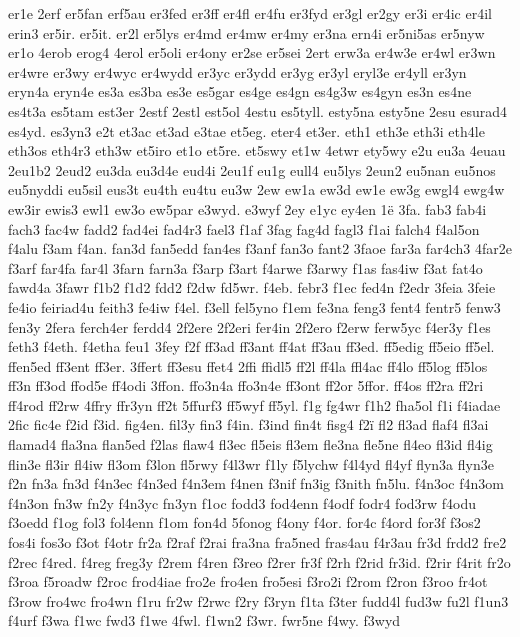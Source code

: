 {er1e
2erf
er5fan
erf5au
er3fed
er3ff
er4fl
er4fu
er3fyd
er3gl
er2gy
er3i
er4ic
er4il
erin3
er5ir.
er5it.
er2l
er5lys
er4md
er4mw
er4my
er3na
ern4i
er5ni5as
er5nyw
er1o
4erob
erog4
4erol
er5oli
er4ony
er2se
er5sei
2ert
erw3a
er4w3e
er4wl
er3wn
er4wre
er3wy
er4wyc
er4wydd
er3yc
er3ydd
er3yg
er3yl
eryl3e
er4yll
er3yn
eryn4a
eryn4e
es3a
es3ba
es3e
es5gar
es4ge
es4gn
es4g3w
es4gyn
es3n
es4ne
es4t3a
es5tam
est3er
2estf
2estl
est5ol
4estu
es5tyll.
esty5na
esty5ne
2esu
esurad4
es4yd.
es3yn3
e2t
et3ac
et3ad
e3tae
et5eg.
eter4
et3er.
eth1
eth3e
eth3i
eth4le
eth3os
eth4r3
eth3w
et5iro
et1o
et5re.
et5swy
et1w
4etwr
ety5wy
e2u
eu3a
4euau
2eu1b2
2eud2
eu3da
eu3d4e
eud4i
2eu1f
eu1g
eull4
eu5lys
2eun2
eu5nan
eu5nos
eu5nyddi
eu5sil
eus3t
eu4th
eu4tu
eu3w
2ew
ew1a
ew3d
ew1e
ew3g
ewgl4
ewg4w
ew3ir
ewis3
ewl1
ew3o
ew5par
e3wyd.
e3wyf
2ey
e1yc
ey4en
1ë
3fa.
fab3
fab4i
fach3
fac4w
fadd2
fad4ei
fad4r3
fael3
f1af
3fag
fag4d
fagl3
f1ai
falch4
f4al5on
f4alu
f3am
f4an.
fan3d
fan5edd
fan4es
f3anf
fan3o
fant2
3faoe
far3a
far4ch3
4far2e
f3arf
far4fa
far4l
3farn
farn3a
f3arp
f3art
f4arwe
f3arwy
f1as
fas4iw
f3at
fat4o
fawd4a
3fawr
f1b2
f1d2
fdd2
f2dw
fd5wr.
f4eb.
febr3
f1ec
fed4n
f2edr
3feia
3feie
fe4io
feiriad4u
feith3
fe4iw
f4el.
f3ell
fel5yno
f1em
fe3na
feng3
fent4
fentr5
fenw3
fen3y
2fera
ferch4er
ferdd4
2f2ere
2f2eri
fer4in
2f2ero
f2erw
ferw5yc
f4er3y
f1es
feth3
f4eth.
f4etha
feu1
3fey
f2f
ff3ad
ff3ant
ff4at
ff3au
ff3ed.
ff5edig
ff5eio
ff5el.
ffen5ed
ff3ent
ff3er.
3ffert
ff3esu
ffet4
2ffi
ffidl5
ff2l
ff4la
ffl4ac
ff4lo
ff5log
ff5los
ff3n
ff3od
ffod5e
ff4odi
3ffon.
ffo3n4a
ffo3n4e
ff3ont
ff2or
5ffor.
ff4os
ff2ra
ff2ri
ff4rod
ff2rw
4ffry
ffr3yn
ff2t
5ffurf3
ff5wyf
ff5yl.
f1g
fg4wr
f1h2
fha5ol
f1i
f4iadae
2fic
fic4e
f2id
f3id.
fig4en.
fil3y
fin3
f4in.
f3ind
fin4t
fisg4
f2ï
fl2
fl3ad
flaf4
fl3ai
flamad4
fla3na
flan5ed
f2las
flaw4
fl3ec
fl5eis
fl3em
fle3na
fle5ne
fl4eo
fl3id
fl4ig
flin3e
fl3ir
fl4iw
fl3om
f3lon
fl5rwy
f4l3wr
f1ly
f5lychw
f4l4yd
fl4yf
flyn3a
flyn3e
f2n
fn3a
fn3d
f4n3ec
f4n3ed
f4n3em
f4nen
f3nif
fn3ig
f3nith
fn5lu.
f4n3oc
f4n3om
f4n3on
fn3w
fn2y
f4n3yc
fn3yn
f1oc
fodd3
fod4enn
f4odf
fodr4
fod3rw
f4odu
f3oedd
f1og
fol3
fol4enn
f1om
fon4d
5fonog
f4ony
f4or.
for4c
f4ord
for3f
f3os2
fos4i
fos3o
f3ot
f4otr
fr2a
f2raf
f2rai
fra3na
fra5ned
fras4au
f4r3au
fr3d
frdd2
fre2
f2rec
f4red.
f4reg
freg3y
f2rem
f4ren
f3reo
f2rer
fr3f
f2rh
f2rid
fr3id.
f2rir
f4rit
fr2o
f3roa
f5roadw
f2roc
frod4iae
fro2e
fro4en
fro5esi
f3ro2i
f2rom
f2ron
f3roo
fr4ot
f3row
fro4wc
fro4wn
f1ru
fr2w
f2rwc
f2ry
f3ryn
f1ta
f3ter
fudd4l
fud3w
fu2l
f1un3
f4urf
f3wa
f1wc
fwd3
f1we
4fwl.
f1wn2
f3wr.
fwr5ne
f4wy.
f3wyd
}
